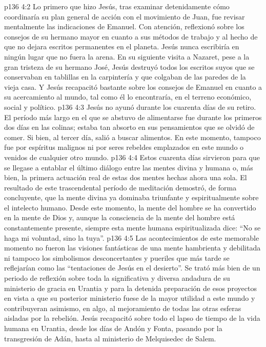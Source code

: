 \vs p136 4:2 Lo primero que hizo Jesús, tras examinar detenidamente cómo coordinaría su plan general de acción con el movimiento de Juan, fue revisar mentalmente las indicaciones de Emanuel. Con atención, reflexionó sobre los consejos de su hermano mayor en cuanto a sus métodos de trabajo y al hecho de que no dejara escritos permanentes en el planeta. Jesús nunca escribiría en ningún lugar que no fuera la arena. En su siguiente visita a Nazaret, pese a la gran tristeza de su hermano José, Jesús destruyó todos los escritos suyos que se conservaban en tablillas en la carpintería y que colgaban de las paredes de la vieja casa. Y Jesús recapacitó bastante sobre los consejos de Emanuel en cuanto a su acercamiento al mundo, tal como él lo encontraría, en el terreno económico, social y político.
\vs p136 4:3 \pc Jesús no ayunó durante los cuarenta días de su retiro. El período más largo en el que se abstuvo de alimentarse fue durante los primeros dos días en las colinas; estaba tan absorto en sus pensamientos que se olvidó de comer. Si bien, al tercer día, salió a buscar alimentos. En este momento, tampoco fue  por espíritus malignos ni por seres rebeldes emplazados en este mundo o venidos de cualquier otro mundo.
\vs p136 4:4 \pc Estos cuarenta días sirvieron para que se llegase a entablar el último diálogo entre las mentes divina y humana o, más bien, la primera actuación real de estas dos mentes hechas ahora una sola. El resultado de este trascendental período de meditación demostró, de forma concluyente, que la mente divina ya dominaba triunfante y espiritualmente sobre el intelecto humano. Desde este momento, la mente del hombre se ha convertido en la mente de Dios y, aunque la consciencia de la mente del hombre está constantemente presente, siempre esta mente humana espiritualizada dice: “No se haga mi voluntad, sino la tuya”.
\vs p136 4:5 Las acontecimientos de este memorable momento no fueron las visiones fantásticas de una mente hambrienta y debilitada ni tampoco los simbolismos desconcertantes y pueriles que más tarde se reflejarían como las “tentaciones de Jesús en el desierto”. Se trató más bien de un periodo de reflexión sobre toda la significativa y diversa andadura de su ministerio de gracia en Urantia y para la detenida preparación de esos proyectos en vista a que su posterior ministerio fuese de la mayor utilidad a este mundo y contribuyeran asimismo, en algo, al mejoramiento de todas las otras esferas aisladas por la rebelión. Jesús recapacitó sobre todo el lapso de tiempo de la vida humana en Urantia, desde los días de Andón y Fonta, pasando por la transgresión de Adán, hasta al ministerio de Melquisedec de Salem.
